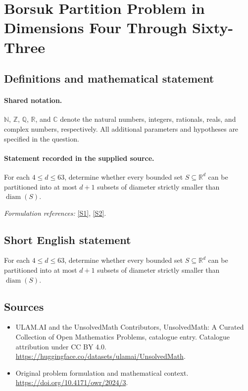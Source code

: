 \documentclass[11pt]{article}
\newcommand{\sref}[2]{\hyperlink{source:#1:#2}{[S#2]}}
\begin{document}
\section{Borsuk Partition Problem in Dimensions Four Through Sixty-Three}\label{statement}

\subsection{Definitions and mathematical statement}

\paragraph{Shared notation.}$\mathbb N$, $\mathbb Z$, $\mathbb Q$, $\mathbb R$, and $\mathbb C$ denote the natural numbers, integers, rationals, reals, and complex numbers, respectively. All additional parameters and hypotheses are specified in the question.


\paragraph{Statement recorded in the supplied source.}
For each $4\leq d\leq 63$, determine whether every bounded set $S\subseteq\mathbb R^d$ can be partitioned into at most $d+1$ subsets of diameter strictly smaller than $\operatorname{diam}(S)$.
\par\smallskip\textit{Formulation references:} \sref{statement}{1}, \sref{statement}{2}.
\subsection{Short English statement}
For each $4\leq d\leq 63$, determine whether every bounded set $S\subseteq\mathbb R^d$ can be partitioned into at most $d+1$ subsets of diameter strictly smaller than $\operatorname{diam}(S)$.
\subsection{Sources}
\begin{itemize}
\item[\hypertarget{source:statement:1}{S1}] ULAM.AI and the UnsolvedMath Contributors, UnsolvedMath: A Curated Collection of Open Mathematics Problems, catalogue entry. Catalogue attribution under CC BY 4.0.
\url{https://huggingface.co/datasets/ulamai/UnsolvedMath}.
\item[\hypertarget{source:statement:2}{S2}] Original problem formulation and mathematical context.
\url{https://doi.org/10.4171/owr/2024/3}.
\end{itemize}
\label{end:statement}
\end{document}
